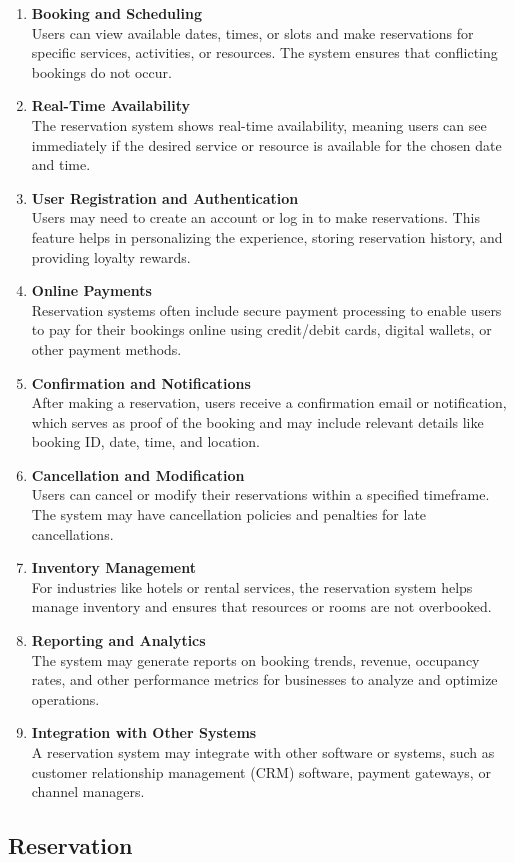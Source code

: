 \begin{enumerate}
    \item \textbf{Booking and Scheduling}\\Users can view available dates, times, or slots and make reservations for specific services, activities, or resources. The system ensures that conflicting bookings do not occur.
    \item \textbf{Real-Time Availability}\\The reservation system shows real-time availability, meaning users can see immediately if the desired service or resource is available for the chosen date and time.
    \item \textbf{User Registration and Authentication}\\Users may need to create an account or log in to make reservations. This feature helps in personalizing the experience, storing reservation history, and providing loyalty rewards.
    \item \textbf{Online Payments}\\Reservation systems often include secure payment processing to enable users to pay for their bookings online using credit/debit cards, digital wallets, or other payment methods.
    \item \textbf{Confirmation and Notifications}\\After making a reservation, users receive a confirmation email or notification, which serves as proof of the booking and may include relevant details like booking ID, date, time, and location.
    \item \textbf{Cancellation and Modification}\\Users can cancel or modify their reservations within a specified timeframe. The system may have cancellation policies and penalties for late cancellations.
    \item \textbf{Inventory Management}\\For industries like hotels or rental services, the reservation system helps manage inventory and ensures that resources or rooms are not overbooked.
    \item \textbf{Reporting and Analytics}\\The system may generate reports on booking trends, revenue, occupancy rates, and other performance metrics for businesses to analyze and optimize operations.
    \item \textbf{Integration with Other Systems}\\A reservation system may integrate with other software or systems, such as customer relationship management (CRM) software, payment gateways, or channel managers.
\end{enumerate}

\subsection{Reservation}
\label{ch:Introduction:sec:Reservation Systems:ssec:Reservation}


